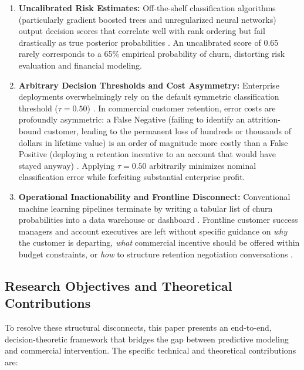 \documentclass[journal,compsoc]{IEEEtran}
\begin{document}
\begin{enumerate}
    \item \textbf{Uncalibrated Risk Estimates:} Off-the-shelf classification algorithms (particularly gradient boosted trees and unregularized neural networks) output decision scores that correlate well with rank ordering but fail drastically as true posterior probabilities \cite{guo2017calibration, niculescu2005predicting}. An uncalibrated score of 0.65 rarely corresponds to a 65\% empirical probability of churn, distorting risk evaluation and financial modeling.
    \item \textbf{Arbitrary Decision Thresholds and Cost Asymmetry:} Enterprise deployments overwhelmingly rely on the default symmetric classification threshold ($\tau = 0.50$) \cite{elkan2001foundations, verbraeken2012novel}. In commercial customer retention, error costs are profoundly asymmetric: a False Negative (failing to identify an attrition-bound customer, leading to the permanent loss of hundreds or thousands of dollars in lifetime value) is an order of magnitude more costly than a False Positive (deploying a retention incentive to an account that would have stayed anyway) \cite{ling2008cost, hand2009measuring}. Applying $\tau = 0.50$ arbitrarily minimizes nominal classification error while forfeiting substantial enterprise profit.
    \item \textbf{Operational Inactionability and Frontline Disconnect:} Conventional machine learning pipelines terminate by writing a tabular list of churn probabilities into a data warehouse or dashboard \cite{power2008understanding, sculley2015hidden}. Frontline customer success managers and account executives are left without specific guidance on \textit{why} the customer is departing, \textit{what} commercial incentive should be offered within budget constraints, or \textit{how} to structure retention negotiation conversations \cite{yao2023react}.
\end{enumerate}

\subsection{Research Objectives and Theoretical Contributions}
To resolve these structural disconnects, this paper presents an end-to-end, decision-theoretic framework that bridges the gap between predictive modeling and commercial intervention. The specific technical and theoretical contributions are:
\end{document}
